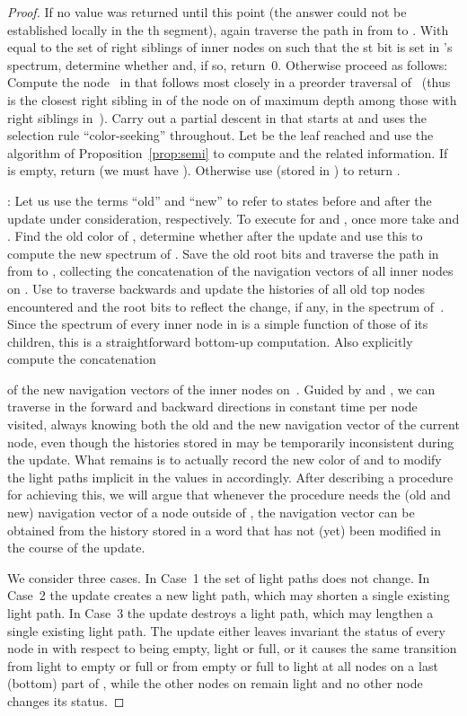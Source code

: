 \documentclass[envcountsame,envcountsect,undated,nolinenumbers]{lnthi}
\begin{document}
\begin{proof}
If no value was returned until this point
(the answer could not be established locally
in the th segment),
again traverse the path  in  from  to .
With  equal to the set of right siblings 
of inner nodes on  
such that the st bit is set in 's spectrum,
determine whether
 and, if so, return~0.
Otherwise proceed as follows:
Compute the node~
in  that follows  most closely in
a preorder traversal of~
(thus  is the closest right sibling in 
of the node on  of maximum depth among
those with right siblings in~).
Carry out a partial descent in  that starts
at  and uses the selection rule
``color-seeking'' throughout.
Let  be the leaf reached and
use the algorithm of
Proposition~\ref{prop:semi} to compute 
and the related information.
If  is empty, return 
(we must have ).
Otherwise use  (stored in ) to return
.

\medskip\noindent
:
Let us use the terms ``old'' and ``new'' to refer
to states before and after the update
under consideration, respectively.
To execute 
for  and ,
once more take
 and .
Find the old color  of ,
determine whether 
after the update and use this
to compute the new spectrum of .
Save the old root bits and
traverse the path  in  from  to , collecting
the concatenation  of the navigation vectors
of all inner nodes on .
Use  to traverse  backwards
and update the histories of all old top nodes
encountered and the root bits to reflect the change,
if any, in the spectrum of~.
Since the spectrum of every inner node
in  is a simple function of those of
its children, this is a straightforward
bottom-up computation.
Also explicitly compute the concatenation

of the
new navigation vectors of the inner nodes on~.
Guided by  and , we can traverse 
in the forward and backward directions
in constant time per node visited, always
knowing both the old and the new navigation vector
of the current node, even though the
histories stored in  may be temporarily
inconsistent during the update.
What remains is to actually record the new
color of  and to modify the light paths
implicit in the values in  accordingly.
After describing a procedure for achieving this,
we will argue that whenever the procedure needs the
(old and new) navigation vector of a node
outside of , the navigation vector can
be obtained from the history stored in
a word that has not (yet) been modified in the
course of the update.

We consider three cases.
In Case~1 the set of light paths does not change.
In Case~2 the update creates a new light path,
which may shorten a single existing light path.
In Case~3 the update destroys
a light path, which may
lengthen a single existing light path.
The update either leaves invariant the status of
every node in  with respect to being
empty, light or full,
or it causes the same transition from light
to empty or full or from empty or full
to light at all nodes
on a last (bottom) part of , while the
other nodes on  remain light and no other
node changes its status.


\end{proof}
\end{document}
